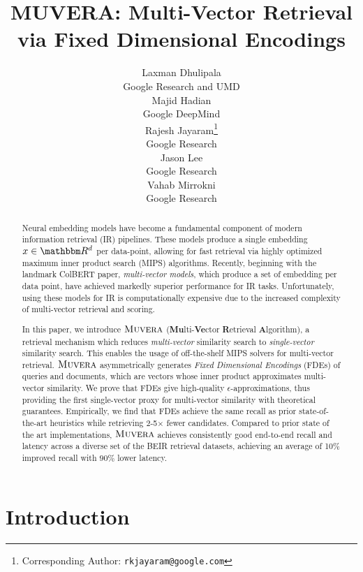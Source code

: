 \documentclass{article}
\title{MUVERA: Multi-Vector Retrieval via Fixed Dimensional Encodings}
\author{%
Laxman Dhulipala \\
 Google Research and UMD \\
\And
Majid Hadian \\
Google DeepMind \\
\And
Rajesh Jayaram\thanks{Corresponding Author: \texttt{rkjayaram@google.com}} \\
Google Research \\
\AND
Jason Lee\\
Google Research \\
\And
Vahab Mirrokni \\
Google Research \\
}
\newcommand{\name}{\textsc{Muvera}}
\begin{document}
\maketitle

\begin{abstract}
Neural embedding models have become a fundamental component of modern information retrieval (IR) pipelines. These models produce a single embedding $x \in \R^d$ per data-point, allowing for fast retrieval via highly optimized maximum inner product search (MIPS) algorithms. Recently, beginning with the landmark ColBERT paper, \textit{multi-vector models}, which produce a set of embedding per data point, have achieved markedly superior performance for IR tasks. Unfortunately, using these models for IR is computationally expensive due to the increased complexity of multi-vector retrieval and scoring. 

In this paper, we introduce $\name$ (\textbf{Mu}lti-\textbf{Ve}ctor \textbf{R}etrieval \textbf{A}lgorithm), a retrieval mechanism which reduces \textit{multi-vector} similarity search to \textit{single-vector} similarity search. 
This enables the usage of off-the-shelf MIPS solvers for multi-vector retrieval. 
$\name$ asymmetrically generates \textit{Fixed Dimensional Encodings} (FDEs) of queries and documents, which are vectors whose inner product approximates multi-vector similarity. We prove that FDEs give high-quality $\epsilon$-approximations, thus providing the first single-vector proxy for multi-vector similarity with theoretical guarantees.
Empirically, we find that FDEs achieve the same recall as prior state-of-the-art heuristics while retrieving 2-5$\times$ fewer candidates. Compared to prior state of the art implementations, $\name$ achieves consistently good end-to-end recall and latency across a diverse set of the BEIR retrieval datasets, achieving an average of 10$\%$ improved recall with $90\%$ lower latency. 


\end{abstract}

\section{Introduction}
\end{document}
